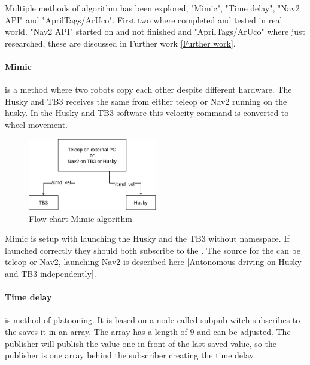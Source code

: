 Multiple methods of algorithm has been explored, "Mimic", "Time delay", "Nav2 API" and "AprilTags/ArUco". First two where completed and tested in real world. "Nav2 API" started on and not finished and "AprilTags/ArUco" where just researched, these are discussed in Further work \ref{Further work}. 

\paragraph{Mimic} \label{Mimic} is a method where two robots copy each other despite different hardware. The Husky and TB3 receives the same  from either teleop or Nav2 running on the husky. In the Husky and TB3 software this velocity command is converted to wheel movement.  

\begin{figure}[H]
    \centering
    \includegraphics[width = 0.5\textwidth]{Figures/drawio/FlowChart_Mimic.drawio.png}
    \caption{Flow chart Mimic algorithm}
    \label{fig:FlowMimic}
\end{figure}

Mimic is setup with launching the Husky and the TB3 without namespace. If launched correctly they should both subscribe to the . The source for the  can be teleop or Nav2, launching Nav2 is described here \ref{Autonomous driving on Husky and TB3 independently}. 

\paragraph{Time delay} \label{Time delay} is method of platooning. It is based on a node called subpub witch subscribes to the  saves it in an array. The array has a length of 9 and can be adjusted. The publisher will publish the value one in front of the last saved value, so the publisher is one array behind the subscriber creating the time delay. 

